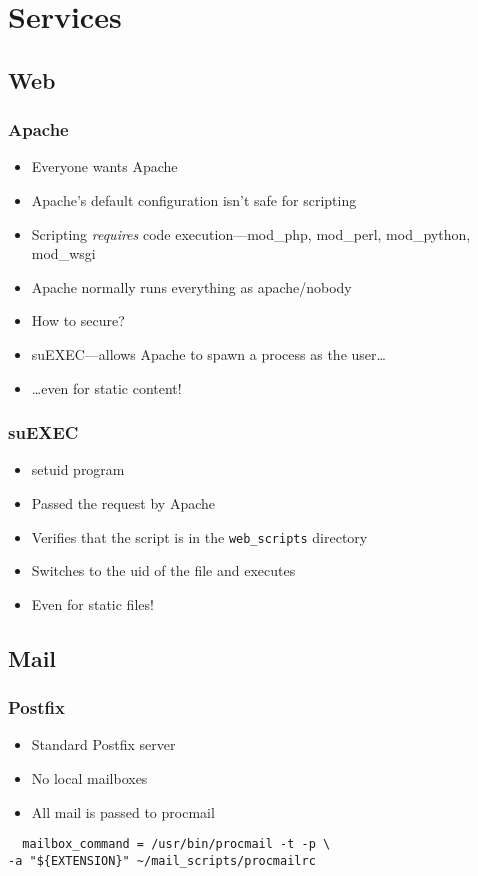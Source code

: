 \section{Services}

\subsection{Web}
\begin{frame}
  \frametitle{Apache}
  \begin{itemize}
      \item Everyone wants Apache
      \item Apache's default configuration isn't safe for scripting
      \item Scripting \emph{requires} code execution---mod\_php, mod\_perl, mod\_python, mod\_wsgi
      \item Apache normally runs everything as apache/nobody
      \item How to secure?
      \pause
      \item suEXEC---allows Apache to spawn a process as the user\ldots
      \item {\ldots}even for static content!
  \end{itemize}
\end{frame}

\begin{frame}
  \frametitle{suEXEC}
  \begin{itemize}
    \item setuid program
    \item Passed the request by Apache
    \item Verifies that the script is in the {\tt web\_scripts} directory
    \item Switches to the uid of the file and executes
    \item Even for static files!
  \end{itemize}
\end{frame}

\subsection{Mail}

\begin{frame}[fragile]
  \frametitle{Postfix}
  \begin{itemize}
    \item Standard Postfix server
    \item No local mailboxes
    \item All mail is passed to procmail
  \end{itemize}
  \begin{verbatim}  mailbox_command = /usr/bin/procmail -t -p \
-a "${EXTENSION}" ~/mail_scripts/procmailrc\end{verbatim}
\end{frame}

